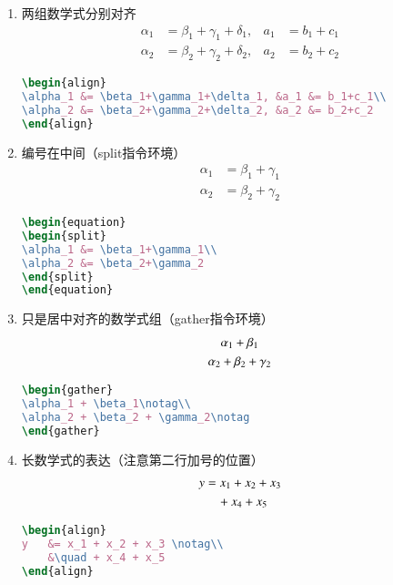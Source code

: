 \begin{enumerate}
\item 两组数学式分别对齐
\begin{align}
\alpha_1 &= \beta_1+\gamma_1+\delta_1, &a_1 &= b_1+c_1\\
\alpha_2 &= \beta_2+\gamma_2+\delta_2, &a_2 &= b_2+c_2
\end{align}
\begin{lstlisting}[language=TeX,numbers=none,frame=lrtb,keywords={begin}]
\begin{align}
\alpha_1 &= \beta_1+\gamma_1+\delta_1, &a_1 &= b_1+c_1\\
\alpha_2 &= \beta_2+\gamma_2+\delta_2, &a_2 &= b_2+c_2
\end{align}
\end{lstlisting}

\item 编号在中间（split指令环境）
\begin{equation}
\begin{split}
\alpha_1 &= \beta_1+\gamma_1\\
\alpha_2 &= \beta_2+\gamma_2
\end{split}
\end{equation}
\begin{lstlisting}[language=TeX,numbers=none,frame=lrtb,keywords={begin}]
\begin{equation}
\begin{split}
\alpha_1 &= \beta_1+\gamma_1\\
\alpha_2 &= \beta_2+\gamma_2
\end{split}
\end{equation}
\end{lstlisting}

\item 只是居中对齐的数学式组（gather指令环境）
\begin{gather}
\alpha_1 + \beta_1\notag\\
\alpha_2 + \beta_2 + \gamma_2\notag
\end{gather}
\begin{lstlisting}[language=TeX,numbers=none,frame=lrtb,keywords={begin}]
\begin{gather}
\alpha_1 + \beta_1\notag\\
\alpha_2 + \beta_2 + \gamma_2\notag
\end{gather}
\end{lstlisting}

\item 长数学式的表达（注意第二行加号的位置）
\begin{align}
y   &= x_1 + x_2 + x_3 \notag\\
    &\quad + x_4 + x_5
\end{align}
\begin{lstlisting}[language=TeX,numbers=none,frame=lrtb,keywords={begin}]
\begin{align}
y   &= x_1 + x_2 + x_3 \notag\\
	&\quad + x_4 + x_5
\end{align}
\end{lstlisting}
\end{enumerate}



